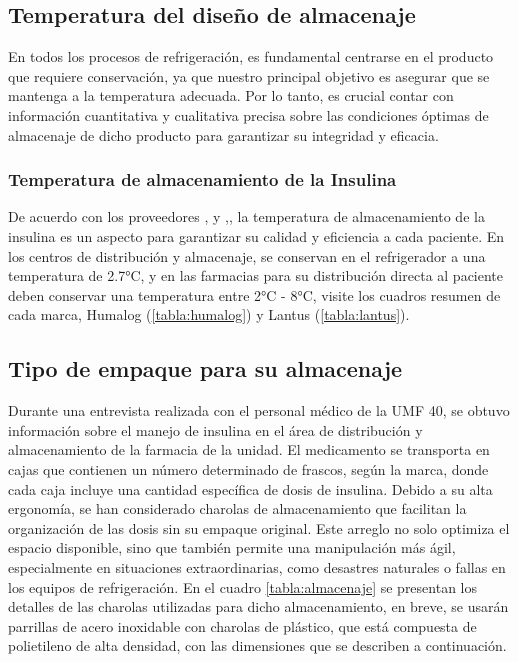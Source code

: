 \subsection{Temperatura del diseño de almacenaje}
 
En todos los procesos de refrigeración, es fundamental centrarse en el producto que requiere conservación, ya que nuestro principal objetivo es asegurar que se mantenga a la temperatura adecuada. Por lo tanto, es crucial contar con información cuantitativa y cualitativa precisa sobre las condiciones óptimas de almacenaje de dicho producto para garantizar su integridad y eficacia.
 
 \subsubsection{Temperatura de almacenamiento de la Insulina}
 
 De acuerdo con los proveedores \citeauthor{lispro-2006}, \citeyear{lispro-2006} y \citeauthor{lantus-2015},\citeyear{lantus-2015}, la temperatura de almacenamiento de la insulina es un aspecto para garantizar su calidad y eficiencia a cada paciente. En los centros de distribución y almacenaje, se conservan en el refrigerador a una temperatura de 2.7°C, y en las farmacias para su distribución directa al paciente deben conservar una temperatura entre 2°C - 8°C, visite los cuadros resumen de cada marca, Humalog (\ref{tabla:humalog}) y Lantus (\ref{tabla:lantus}).
 
 \subsection{Tipo de empaque para su almacenaje}
 
Durante una entrevista realizada con el personal médico de la UMF 40, se obtuvo información sobre el manejo de insulina en el área de distribución y almacenamiento de la farmacia de la unidad. El medicamento se transporta en cajas que contienen un número determinado de frascos, según la marca, donde cada caja incluye una cantidad específica de dosis de insulina. Debido a su alta ergonomía, se han considerado charolas de almacenamiento que facilitan la organización de las dosis sin su empaque original. Este arreglo no solo optimiza el espacio disponible, sino que también permite una manipulación más ágil, especialmente en situaciones extraordinarias, como desastres naturales o fallas en los equipos de refrigeración. En el cuadro \ref{tabla:almacenaje} se presentan los detalles de las charolas utilizadas para dicho almacenamiento, en breve, se usarán parrillas de acero inoxidable con charolas de plástico, que está compuesta de polietileno de alta densidad, con las dimensiones que se describen a continuación.
